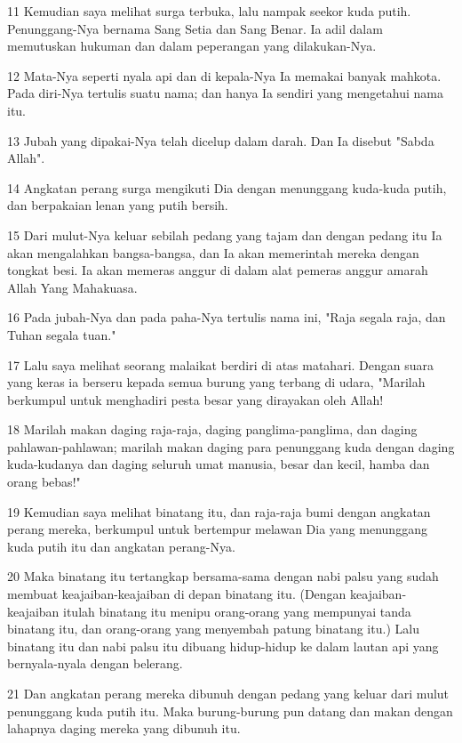 \par 11 Kemudian saya melihat surga terbuka, lalu nampak seekor kuda putih. Penunggang-Nya bernama Sang Setia dan Sang Benar. Ia adil dalam memutuskan hukuman dan dalam peperangan yang dilakukan-Nya.
\par 12 Mata-Nya seperti nyala api dan di kepala-Nya Ia memakai banyak mahkota. Pada diri-Nya tertulis suatu nama; dan hanya Ia sendiri yang mengetahui nama itu.
\par 13 Jubah yang dipakai-Nya telah dicelup dalam darah. Dan Ia disebut "Sabda Allah".
\par 14 Angkatan perang surga mengikuti Dia dengan menunggang kuda-kuda putih, dan berpakaian lenan yang putih bersih.
\par 15 Dari mulut-Nya keluar sebilah pedang yang tajam dan dengan pedang itu Ia akan mengalahkan bangsa-bangsa, dan Ia akan memerintah mereka dengan tongkat besi. Ia akan memeras anggur di dalam alat pemeras anggur amarah Allah Yang Mahakuasa.
\par 16 Pada jubah-Nya dan pada paha-Nya tertulis nama ini, "Raja segala raja, dan Tuhan segala tuan."
\par 17 Lalu saya melihat seorang malaikat berdiri di atas matahari. Dengan suara yang keras ia berseru kepada semua burung yang terbang di udara, "Marilah berkumpul untuk menghadiri pesta besar yang dirayakan oleh Allah!
\par 18 Marilah makan daging raja-raja, daging panglima-panglima, dan daging pahlawan-pahlawan; marilah makan daging para penunggang kuda dengan daging kuda-kudanya dan daging seluruh umat manusia, besar dan kecil, hamba dan orang bebas!"
\par 19 Kemudian saya melihat binatang itu, dan raja-raja bumi dengan angkatan perang mereka, berkumpul untuk bertempur melawan Dia yang menunggang kuda putih itu dan angkatan perang-Nya.
\par 20 Maka binatang itu tertangkap bersama-sama dengan nabi palsu yang sudah membuat keajaiban-keajaiban di depan binatang itu. (Dengan keajaiban-keajaiban itulah binatang itu menipu orang-orang yang mempunyai tanda binatang itu, dan orang-orang yang menyembah patung binatang itu.) Lalu binatang itu dan nabi palsu itu dibuang hidup-hidup ke dalam lautan api yang bernyala-nyala dengan belerang.
\par 21 Dan angkatan perang mereka dibunuh dengan pedang yang keluar dari mulut penunggang kuda putih itu. Maka burung-burung pun datang dan makan dengan lahapnya daging mereka yang dibunuh itu.

